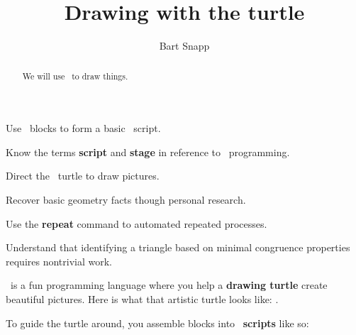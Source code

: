 \documentclass{ximera}
\title{Drawing with the turtle}
\author{Bart Snapp}
\begin{document}
\begin{abstract}
  We will use \snap\ to draw things.
\end{abstract}
\maketitle

\begin{listOutcomes}
\item{Use \snap\ blocks to form a basic \snap\ script.}
\item{Know the terms \textbf{script} and \textbf{stage} in reference to \snap\ programming.}
\item{Direct the \snap\ turtle to draw pictures.}
\item{Recover basic geometry facts though personal research.}
\item{Use the \textbf{repeat} command to automated repeated processes.}
\item{Understand that identifying a triangle based on minimal congruence properties requires nontrivial work.}
\end{listOutcomes}

\snap\ is a fun programming language where you help a \textbf{drawing
  turtle} create beautiful pictures.  Here is what that artistic
turtle looks like:
.


To guide the turtle around, you assemble blocks into
\snap\ \textbf{scripts} like so:

\mynewpage
\end{document}
